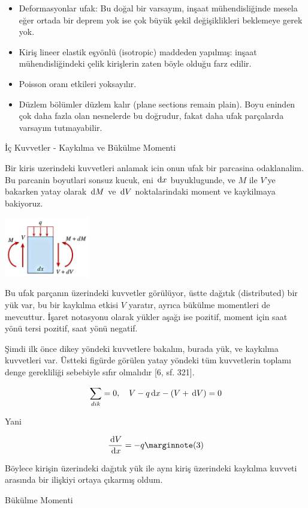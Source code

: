 \documentclass[12pt,fleqn]{article}\usepackage{../../common}
\begin{document}
\begin{itemize}
   \item Deformasyonlar ufak: Bu doğal bir varsayım, inşaat mühendisliğinde
     mesela eğer ortada bir deprem yok ise çok büyük şekil değişiklikleri
     beklemeye gerek yok. 
   \item Kiriş lineer elastik eşyönlü (isotropic) maddeden yapılmış: inşaat
     mühendisliğindeki çelik kirişlerin zaten böyle olduğu farz edilir.
   \item Poisson oranı etkileri yoksayılır.
   \item Düzlem bölümler düzlem kalır (plane sections remain plain). Boyu
     eninden çok daha fazla olan nesnelerde bu doğrudur, fakat daha ufak
     parçalarda varsayım tutmayabilir.
\end{itemize}

İç Kuvvetler - Kaykılma ve Bükülme Momenti

Bir kiris uzerindeki kuvvetleri anlamak icin onun ufak bir parcasina
odaklanalim. Bu parcanin boyutlari sonsuz kucuk, eni $\,\mathrm{d} x$ buyuklugunde,
ve $M$ ile $V$'ye bakarken yatay olarak $\,\mathrm{d} M$ ve $\,\mathrm{d} V$ noktalarindaki
moment ve kaykilmaya bakiyoruz. 

\includegraphics[width=10em]{phy_020_strs_02_10.jpg}

Bu ufak parçanın üzerindeki kuvvetler görülüyor, üstte dağıtık (distributed) bir
yük var, bu bir kaykılma etkisi $V$ yaratır, ayrıca bükülme momentleri de
mevcuttur. İşaret notasyonu olarak yükler aşağı ise pozitif, moment için
saat yönü tersi pozitif, saat yönü negatif.

Şimdi ilk önce dikey yöndeki kuvvetlere bakalım, burada yük, ve kaykılma
kuvvetleri var. Üstteki figürde görülen yatay yöndeki tüm kuvvetlerin toplamı
denge gerekliliği sebebiyle sıfır olmalıdır [6, sf. 321].

$$
\sum_{dik} = 0, \quad V - q \,\mathrm{d} x - (V + \,\mathrm{d} V) = 0
$$

Yani

$$
\frac{\ud V}{\ud x} = -q
\mlabel{3}
$$

Böylece kirişin üzerindeki dağıtık yük ile aynı kiriş üzerindeki kaykılma
kuvveti arasında bir ilişkiyi ortaya çıkarmış oldum. 

Bükülme Momenti
\end{document}
